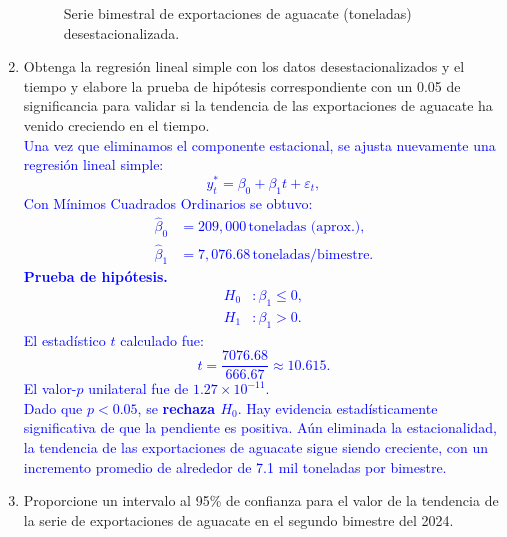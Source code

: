 \documentclass[10pt]{article}
\begin{document}
\begin{enumerate}
\begin{figure}[H]
    \caption{Serie bimestral de exportaciones de aguacate (toneladas) desestacionalizada.}
    \label{fig:serie_bimestral_deseasonalized}
  \end{figure}
    \item Obtenga la regresión lineal simple con los datos desestacionalizados y el tiempo y elabore la prueba de hipótesis correspondiente con un 0.05 de significancia para validar si la tendencia de las exportaciones de aguacate ha venido creciendo en el tiempo.\\
    \textcolor{blue}{
      \noindent Una vez que eliminamos el componente estacional, se ajusta nuevamente una regresión lineal simple:
      \begin{equation}
        y^{*}_t = \beta_0 + \beta_1 t + \varepsilon_t,
      \end{equation}
      \noindent Con Mínimos Cuadrados Ordinarios se obtuvo:
      \begin{align}
        \hat{\beta}_0 &= 209{,}000 \,\text{toneladas (aprox.)}, \\
        \hat{\beta}_1 &= 7{,}076.68 \,\text{toneladas/bimestre}.
      \end{align}
      \noindent\textbf{Prueba de hipótesis.} 
      \begin{align}
        H_0 &: \beta_1 \leq 0, \\
        H_1 &: \beta_1 > 0.
      \end{align}
      El estadístico $t$ calculado fue:
      \begin{equation}
        t = \frac{7076.68}{666.67} \approx 10.615.
      \end{equation}
      El valor-$p$ unilateral fue de $1.27 \times 10^{-11}$.\\
      Dado que $p < 0.05$, se \textbf{rechaza $H_0$}. Hay evidencia estadísticamente significativa de que la pendiente es positiva.
      Aún eliminada la estacionalidad, la tendencia de las exportaciones de aguacate sigue siendo creciente, con un incremento promedio de alrededor de 7.1 mil toneladas por bimestre.
    }
    \item Proporcione un intervalo al 95\% de confianza para el valor de la tendencia de la serie de exportaciones de aguacate en el segundo bimestre del 2024.\\

\end{enumerate}
\end{document}
